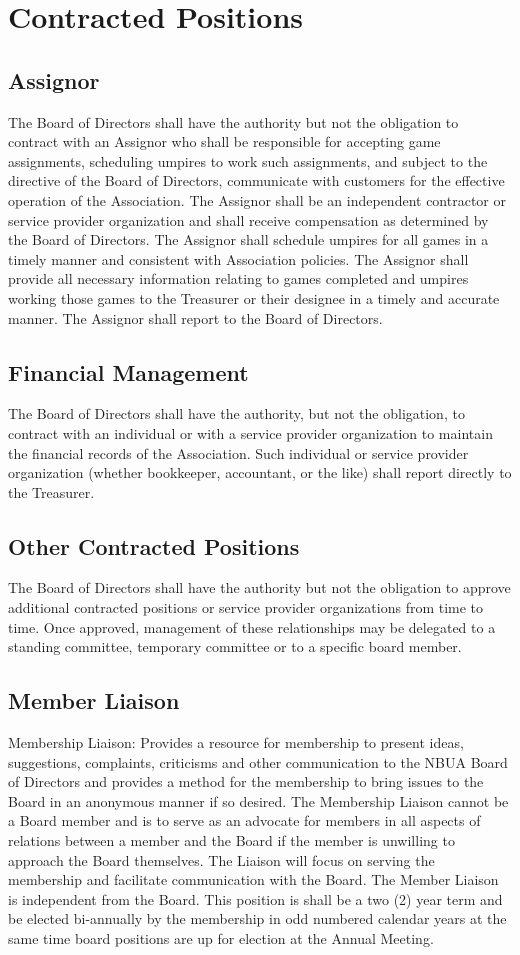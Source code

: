 \documentclass[letterpaper,11pt]{article}
\begin{document}
\section{Contracted Positions}
\subsection{Assignor}
The Board of Directors shall have the authority but not the obligation to contract with an Assignor who shall be responsible for accepting game assignments, scheduling umpires to work such assignments, and subject to the directive of the Board of Directors, communicate with customers for the effective operation of the Association. The Assignor shall be an independent contractor or service provider organization and shall receive compensation as determined by the Board of Directors. The Assignor shall schedule umpires for all games in a timely manner and consistent with Association policies. The Assignor shall provide all necessary information relating to games completed and umpires working those games to the Treasurer or their designee in a timely and accurate manner. The Assignor shall report to the Board of Directors.
\subsection{Financial Management}
The Board of Directors shall have the authority, but not the obligation, to contract with an individual or with a service provider organization to maintain the financial records of the Association. Such individual or service provider organization (whether bookkeeper, accountant, or the like) shall report directly to the Treasurer. 
\subsection{Other Contracted Positions}
The Board of Directors shall have the authority but not the obligation to approve additional contracted positions or service provider organizations from time to time. Once approved, management of these relationships may be delegated to a standing committee, temporary committee or to a specific board member.
\subsection{Member Liaison}
Membership Liaison: Provides a resource for membership to present ideas, suggestions, complaints, criticisms and other communication to the NBUA Board of Directors and provides a method for the membership to bring issues to the Board in an anonymous manner if so desired. The Membership Liaison cannot be a Board member and is to serve as an advocate for members in all aspects of relations between a member and the Board if the member is unwilling to approach the Board themselves. The Liaison will focus on serving the membership and facilitate communication with the Board. The Member Liaison is independent from the Board. This position is shall be a two (2) year term and be elected bi-annually by the membership in odd numbered calendar years at the same time board positions are up for election at the Annual Meeting.
\end{document}
